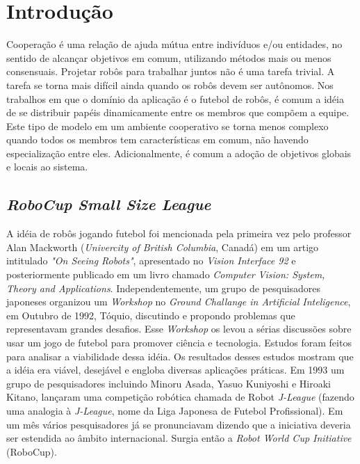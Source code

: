\chapter{Introdução}

Cooperação é uma relação de ajuda mútua entre indivíduos e/ou entidades, no sentido
de alcançar objetivos em comum, utilizando métodos mais ou menos consensuais. Projetar
robôs para trabalhar juntos não é uma tarefa trivial. A tarefa se torna mais difícil
ainda quando os robôs devem ser autônomos. Nos trabalhos em que o domínio da aplicação
é o futebol de robôs, é comum a idéia de se distribuir papéis dinamicamente entre os
membros que compõem a equipe. Este tipo de modelo em um ambiente cooperativo se torna
menos complexo quando todos os membros tem características em comum, não havendo especialização
entre eles. Adicionalmente, é comum a adoção de objetivos globais e locais ao sistema.

\section{\textit{RoboCup Small Size League}}

A idéia de robôs jogando futebol foi mencionada pela primeira vez pelo professor
Alan Mackworth (\textit{Univercity of British Columbia}, Canadá) em um artigo intitulado
\textit{"On Seeing Robots"}, apresentado no \textit{Vision Interface 92} e posteriormente publicado em
um livro chamado \textit{Computer Vision: System, Theory and Applications}. Independentemente,
um grupo de pesquisadores japoneses organizou um \textit{Workshop} no \textit{Ground Challange
in Artificial Inteligence}, em Outubro de 1992, Tóquio, discutindo e propondo problemas que
representavam grandes desafios. Esse \textit{Workshop} os levou a sérias discussões sobre
usar um jogo de futebol para promover ciência e tecnologia. Estudos foram feitos para
analisar a viabilidade dessa idéia. Os resultados desses estudos mostram que
a idéia era viável, desejável e engloba diversas aplicações práticas. Em 1993 um
grupo de pesquisadores incluindo Minoru Asada, Yasuo Kuniyoshi e Hiroaki Kitano,
lançaram uma competição robótica chamada de Robot \textit{J-League} (fazendo uma analogia à
\textit{J-League}, nome da Liga Japonesa de Futebol Profissional). Em um mês vários
pesquisadores já se pronunciavam dizendo que a iniciativa deveria ser estendida ao
âmbito internacional. Surgia então a \textit{Robot World Cup Initiative} (RoboCup).

